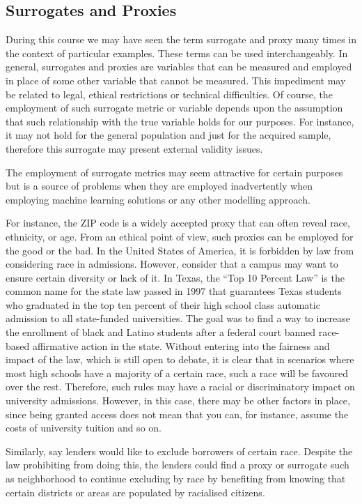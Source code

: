 \documentclass[
]{book}
\begin{document}
\hypertarget{surrogates-and-proxies}{%
\subsection{Surrogates and Proxies}\label{surrogates-and-proxies}}

During this course we may have seen the term surrogate and proxy many times in the context of particular examples. These terms can be used interchangeably. In general, surrogates and proxies are variables that can be measured and employed in place of some other variable that cannot be measured. This impediment may be related to legal, ethical restrictions or technical difficulties. Of course, the employment of such surrogate metric or variable depends upon the assumption that such relationship with the true variable holds for our purposes. For instance, it may not hold for the general population and just for the acquired sample, therefore this surrogate may present external validity issues.

The employment of surrogate metrics may seem attractive for certain purposes but is a source of problems when they are employed inadvertently when employing machine learning solutions or any other modelling approach.

For instance, the ZIP code is a widely accepted proxy that can often reveal race, ethnicity, or age. From an ethical point of view, such proxies can be employed for the good or the bad. In the United States of America, it is forbidden by law from considering race in admissions. However, consider that a campus may want to ensure certain diversity or lack of it. In Texas, the ``Top 10 Percent Law'' is the common name for the state law passed in 1997 that guarantees Texas students who graduated in the top ten percent of their high school class automatic admission to all state-funded universities. The goal was to find a way to increase the enrollment of black and Latino students after a federal court banned race-based affirmative action in the state. Without entering into the fairness and impact of the law, which is still open to debate, it is clear that in scenarios where most high schools have a majority of a certain race, such a race will be favoured over the rest. Therefore, such rules may have a racial or discriminatory impact on university admissions. However, in this case, there may be other factors in place, since being granted access does not mean that you can, for instance, assume the costs of university tuition and so on.

Similarly, say lenders would like to exclude borrowers of certain race. Despite the law prohibiting from doing this, the lenders could find a proxy or surrogate such as neighborhood to continue excluding by race by benefiting from knowing that certain districts or areas are populated by racialised citizens.
\end{document}
